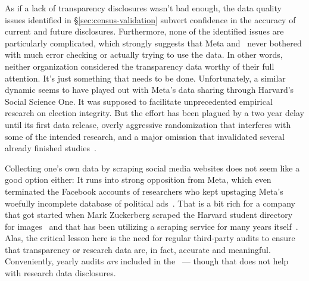 As if a lack of transparency disclosures wasn't bad enough, the data quality
issues identified in \S\ref{sec:census-validation} subvert confidence in the
accuracy of current and future disclosures. Furthermore, none of the identified
issues are particularly complicated, which strongly suggests that Meta and
\NCMEC\ never bothered with much error checking or actually trying to use the
data. In other words, neither organization considered the transparency data
worthy of their full attention. It's just something that needs to be done.
Unfortunately, a similar dynamic seems to have played out with Meta's data
sharing through Harvard's Social Science One. It was supposed to facilitate
unprecedented empirical research on election integrity. But the effort has been
plagued by a two year delay until its first data release, overly aggressive
randomization that interferes with some of the intended research, and a major
omission that invalidated several already finished
studies~\cite{Hegelich2020,HegelichMarcoea2020,Ingram2022,Timberg2021}.

Collecting one's own data by scraping social media websites does not seem like a
good option either: It runs into strong opposition from Meta, which even
terminated the Facebook accounts of researchers who kept upstaging Meta's
woefully incomplete database of political
ads~\cite{EdelsonMcCoy2021a,Faife2021a,MerrillTobin2019,Roose2021a}. That is a
bit rich for a company that got started when Mark Zuckerberg scraped the Harvard
student directory for images~\cite{Madrigal2019} and that has been utilizing a
scraping service for many years itself~\cite{Newman2023}. Alas, the critical
lesson here is the need for regular third-party audits to ensure that
transparency or research data are, in fact, accurate and meaningful.
Conveniently, yearly audits \emph{are} included in the \DSA\ --- though that
does not help with research data disclosures.

